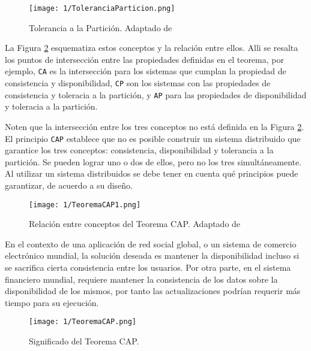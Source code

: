 \begin{figure}[H]%
			\begin{center}
	\texttt{[image: 1/ToleranciaParticion.png]}
	\caption{Tolerancia a la Partici\'on. Adaptado de \cite{Limoncelli2014} }
	\label{fig:marginToleranciaParticion}
		\end{center}
\end{figure}
 
La Figura \ref{fig:marginTeoremaCAP} esquematiza estos conceptos y la relaci\'on entre ellos. Alli se resalta los puntos de intersecci\'on entre las propiedades definidas en el teorema, por ejemplo, \texttt{CA} es la intersecci\'on para los sistemas que cumplan la propiedad de consistencia y disponibilidad, \texttt{CP} son los sistemas con las propiedades de consistencia y toleracia a la partici\'on, y \texttt{AP} para las propiedades de disponibilidad y toleracia a la partici\'on.

Noten que la intersecci\'on entre los tres conceptos  no est\'a definida en la Figura \ref{fig:marginTeoremaCAP}. El principio \texttt{CAP} establece que no es posible construir un sistema distribuido que garantice los tres conceptos: consistencia, disponibilidad y tolerancia a la partici\'on. Se pueden lograr uno o dos de ellos, pero no los tres simultáneamente. Al utilizar un sistema distribuidos se debe tener en cuenta qu\'e principios puede garantizar, de acuerdo a su dise\~no. 

\begin{figure}%
			\begin{center}
	\texttt{[image: 1/TeoremaCAP1.png]}
	\caption{ Relaci\'on entre conceptos del Teorema CAP. Adaptado  de \cite{Deka2017}}
	\label{fig:marginTeoremaCAP}
			\end{center}
\end{figure}


En el contexto de una aplicaci\'on de red social global, o un sistema de comercio electr\'onico mundial, la solución deseada es mantener la disponibilidad incluso si se sacrifica cierta consistencia entre los usuarios. Por otra parte, en el sistema financiero mundial, requiere  mantener la consistencia de los datos sobre la disponibilidad de los mismos, por tanto las actualizaciones podr\'ian requerir m\'as tiempo para su ejecuci\'on. 
\begin{figure}
			\begin{center}
	\texttt{[image: 1/TeoremaCAP.png]}
	\caption {Significado del Teorema CAP.}
	\label{fig:TeoremaCAP}
			\end{center}
\end{figure}

